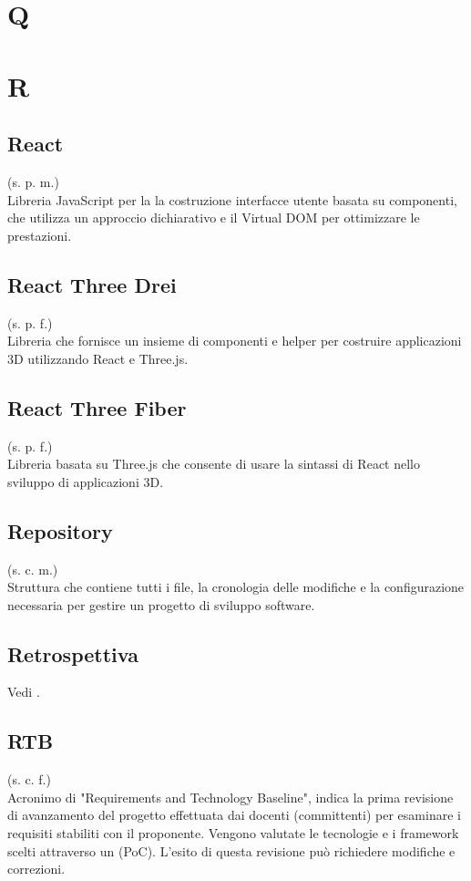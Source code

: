 \pagebreak
\section{Q}
\pagebreak
\section{R}
    \subsection{React}
    (s. p. m.)\\
    Libreria JavaScript per la la costruzione interfacce utente basata su componenti, che utilizza un 
    approccio dichiarativo e il Virtual DOM per ottimizzare le prestazioni.
    \subsection{React Three Drei}
    \label{React Three Drei}
    (s. p. f.)\\
    Libreria che fornisce un insieme di componenti e helper per 
    costruire applicazioni 3D utilizzando React e Three.js.
    \subsection{React Three Fiber}
    \label{React Three Fiber}
    (s. p. f.)\\
    Libreria basata su Three.js che consente di usare la sintassi
    di React nello sviluppo di applicazioni 3D.
    \subsection{Repository}
    \label{Repository}
    (s. c. m.)\\
    Struttura che contiene tutti i file, la cronologia delle modifiche e la 
    configurazione necessaria per gestire un progetto di sviluppo software.
    \subsection{Retrospettiva}
    Vedi .
    \subsection{RTB}
    \label{RTB}
    (s. c. f.)\\
    Acronimo di "Requirements and Technology Baseline", indica la prima revisione di avanzamento del progetto effettuata dai docenti (committenti) per esaminare i requisiti stabiliti con il proponente. Vengono valutate le tecnologie e i framework scelti attraverso un  (PoC). L'esito di questa revisione può richiedere modifiche e correzioni.
\pagebreak
